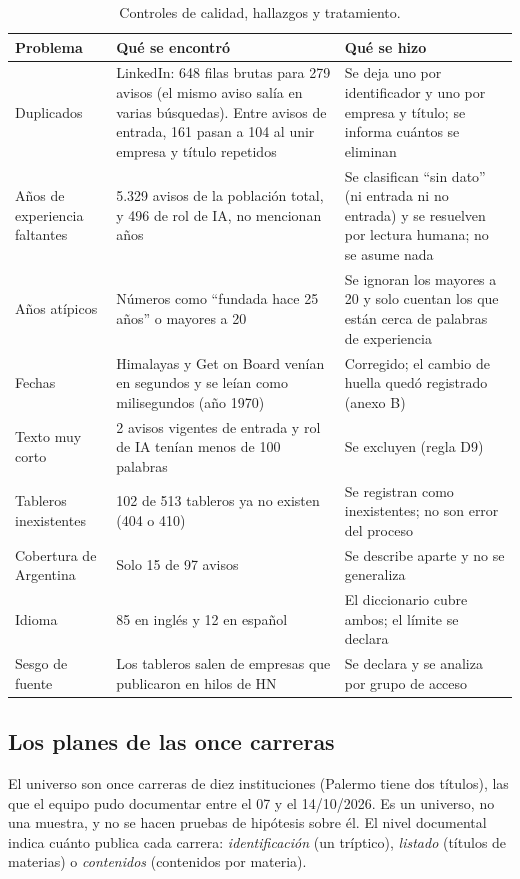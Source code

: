 \documentclass[11pt,a4paper]{article}
\begin{document}
\begin{table}[H]
\centering\small
\begin{tabularx}{\textwidth}{L{3.2cm} L{4.4cm} X}
\toprule
\textbf{Problema} & \textbf{Qué se encontró} & \textbf{Qué se hizo}\\
\midrule
Duplicados & LinkedIn: 648 filas brutas para 279 avisos (el mismo aviso salía en varias búsquedas). Entre avisos de entrada, 161 pasan a 104 al unir empresa y título repetidos & Se deja uno por identificador y uno por empresa y título; se informa cuántos se eliminan\\
Años de experiencia faltantes & 5.329 avisos de la población total, y 496 de rol de IA, no mencionan años & Se clasifican ``sin dato'' (ni entrada ni no entrada) y se resuelven por lectura humana; no se asume nada\\
Años atípicos & Números como ``fundada hace 25 años'' o mayores a 20 & Se ignoran los mayores a 20 y solo cuentan los que están cerca de palabras de experiencia\\
Fechas & Himalayas y Get on Board venían en segundos y se leían como milisegundos (año 1970) & Corregido; el cambio de huella quedó registrado (anexo B)\\
Texto muy corto & 2 avisos vigentes de entrada y rol de IA tenían menos de 100 palabras & Se excluyen (regla D9)\\
Tableros inexistentes & 102 de 513 tableros ya no existen (404 o 410) & Se registran como inexistentes; no son error del proceso\\
Cobertura de Argentina & Solo 15 de 97 avisos & Se describe aparte y no se generaliza\\
Idioma & 85 en inglés y 12 en español & El diccionario cubre ambos; el límite se declara\\
Sesgo de fuente & Los tableros salen de empresas que publicaron en hilos de HN & Se declara y se analiza por grupo de acceso\\
\bottomrule
\end{tabularx}
\caption{Controles de calidad, hallazgos y tratamiento.}
\end{table}

\subsection{Los planes de las once carreras}
El universo son once carreras de diez instituciones (Palermo tiene dos títulos), las que el equipo pudo documentar entre el 07 y el 14/10/2026. Es un universo, no una muestra, y no se hacen pruebas de hipótesis sobre él. El nivel documental indica cuánto publica cada carrera: \emph{identificación} (un tríptico), \emph{listado} (títulos de materias) o \emph{contenidos} (contenidos por materia).
\end{document}
